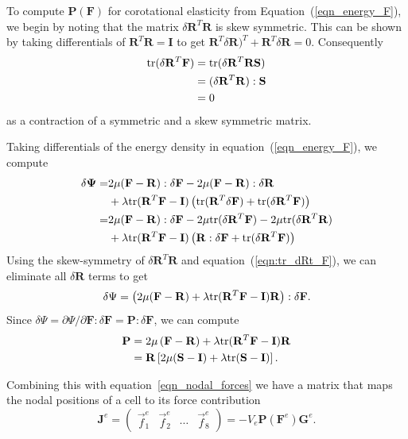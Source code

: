 To compute $\mathbf{P}(\mathbf{F})$ for corotational elasticity from
Equation~(\ref{eqn_energy_F}), we begin by noting that the matrix $\delta\mathbf{R}^T\mathbf{R}$
is skew symmetric.  This can be shown by taking differentials of
$\mathbf{R}^T\mathbf{R}=\mathbf{I}$ to get $\mathbf{R}^T\!\delta\mathbf{R})^T+\mathbf{R}^T\!\delta\mathbf{R}=0$.
Consequently 
\begin{align}
\mbox{tr}(\delta\mathbf{R}^T\mathbf{F})&=\mbox{tr}(\delta\mathbf{R}^T\mathbf{RS})\nonumber\\
        &=(\delta\mathbf{R}^T\mathbf{R}):\mathbf{S}\nonumber\\
        &=0\label{eqn:tr_dRt_F}
\end{align} 
as a contraction of a
symmetric and a skew symmetric matrix. 

Taking differentials of the energy density in
equation~(\ref{eqn_energy_F}), we compute
\begin{align*}
\delta\mathbf{\Psi} =&
2\mu(\mathbf{F}-\mathbf{R}):\delta\mathbf{F}-2\mu(\mathbf{F}-\mathbf{R}):\delta\mathbf{R}\\
&+\lambda\mbox{tr}(\mathbf{R}^T\mathbf{F}-\mathbf{I})\left(\mbox{tr}(\mathbf{R}^T\delta\mathbf{F})+\mbox{tr}(\delta\mathbf{R}^T\mathbf{F})\right)\\
=&2\mu(\mathbf{F}-\mathbf{R}):\delta\mathbf{F}-2\mu\mbox{tr}(\delta\mathbf{R}^T\mathbf{F})-2\mu\mbox{tr}(\delta\mathbf{R}^T\mathbf{R})\\
 &+\lambda\mbox{tr}(\mathbf{R}^T\mathbf{F}-\mathbf{I})\left(\mathbf{R}:\delta\mathbf{F}+\mbox{tr}(\delta\mathbf{R}^T\mathbf{F})\right)
\end{align*}
Using the skew-symmetry of $\delta\mathbf{R}^T\mathbf{R}$
and equation~(\ref{eqn:tr_dRt_F}), we can eliminate all
$\delta\mathbf{R}$ terms to get
\begin{equation}
\delta\Psi=\left(2\mu(\mathbf{F}-\mathbf{R})+\lambda\mbox{tr}(\mathbf{R}^T\mathbf{F}-\mathbf{I})\mathbf{R}\right):\delta\mathbf{F}.\label{eqn:dPsi}
\end{equation}
Since $\delta\Psi = \partial\Psi/\partial\mathbf{F}:\delta\mathbf{F} = \mathbf{P}:\delta\mathbf{F}$, we can compute 
\begin{align}
\mathbf{P}&=2\mu\left(\mathbf{F}-\mathbf{R}\right) + \lambda \mbox{tr}(\mathbf{R}^T\mathbf{F}-\mathbf{I})\mathbf{R}\nonumber\\
        &=\mathbf{R}\left[2\mu(\mathbf{S}-\mathbf{I})+\lambda \mbox{tr}(\mathbf{S}-\mathbf{I})\right].\label{eqn_piola_stress}
\end{align}


Combining this with equation~\ref{eqn_nodal_forces} we have a matrix
that maps the nodal positions of a cell to its force contribution
\begin{equation}
\mathbf{J}^e
=
\left(
\begin{array}{cccc}
\vec{f}_1^e &
\vec{f}_2^e &
\cdots &
\vec{f}_8^e
\end{array}
\right)
=-V_e\mathbf{P}(\mathbf{F}^e)\mathbf{G}^e.
\label{eqn_cell_forces}
\end{equation}

